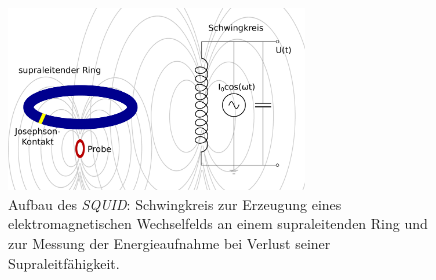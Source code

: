 \begin{figure}[H]
\begin{center}
  \includegraphics[width=0.7\textwidth]{../img/aufbau2.pdf}
  \caption{Aufbau des \emph{SQUID}: Schwingkreis zur Erzeugung eines elektromagnetischen Wechselfelds
  an einem supraleitenden Ring und zur Messung der Energieaufnahme bei Verlust seiner Supraleitfähigkeit.}
  \label{img:aufbau2}
\end{center}
\end{figure}